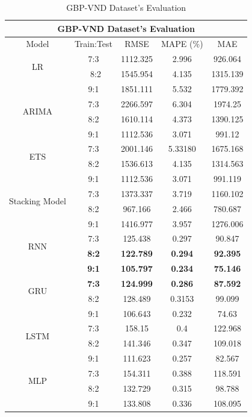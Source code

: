 \documentclass{ieeeojies}
\begin{document}
\begin{table}[H]
    \centering
    \begin{tabular}{|c|c|c|c|c|}
         \hline
         \multicolumn{5}{|c|}{\textbf{GBP-VND Dataset's Evaluation}}\\
         \hline
         \centering Model & Train:Test & RMSE & MAPE (\%) & MAE\\
         \hline
         \multirow{2}{*}{LR} &7:3& 1112.325 &2.996&926.064\\ &\ 8:2 & 1545.954& 4.135  & 1315.139 \\&9:1 &1851.111  & 5.532  &1779.392  \\
         \hline
         \multirow{2}{*}{ARIMA} &7:3 & 2266.597 &6.304 &1974.25 \\ & 8:2 & 1610.114 & 4.373 & 1390.125 \\&9:1&1112.536 &3.071 & 991.12\\
         \hline
         \multirow{2}{*}{ETS} & 7:3 & 2001.146 & 5.33180 & 1675.168 \\ & 8:2 & 1536.613 & 4.135 & 1314.563 \\& 9:1 & 1112.536 & 3.071 & 991.119\\
         \hline
         \multirow{2}{*}{Stacking Model}&7:3&1373.337&3.719&1160.102\\&8:2&967.166&2.466&780.687\\&9:1&1416.977&3.957&1276.006 \\
         \hline
         \multirow{2}{*}{RNN} & 7:3 & 125.438 & 0.297 & 90.847 \\ & \textbf{8:2} & \textbf{122.789} & \textbf{0.294} & \textbf{92.395} \\ & \textbf{9:1} & \textbf{105.797} & \textbf{0.234} & \textbf{75.146} \\
         \hline
         \multirow{2}{*}{GRU} & \textbf{7:3} & \textbf{124.999} & \textbf{0.286} & \textbf{87.592} \\ & 8:2 & 128.489 & 0.3153 & 99.099 \\ & 9:1 & 106.643 & 0.232 & 74.63 \\
         \hline
         \multirow{2}{*}{LSTM} &7:3 &158.15& 0.4& 122.968 \\ & 8:2 &141.346& 0.347& 109.018\\&9:1&111.623& 0.257& 82.567\\
         \hline
         \multirow{2}{*}{MLP} & 7:3 & 154.311& 0.388 &118.591 \\ &8:2 & 132.729& 0.315& 98.788\\ & 9:1 & 133.808& 0.336 &108.095\\
         \hline
    \end{tabular}
    \caption{GBP-VND Dataset's Evaluation}
    \label{mbbresult}
\end{table}
\end{document}

